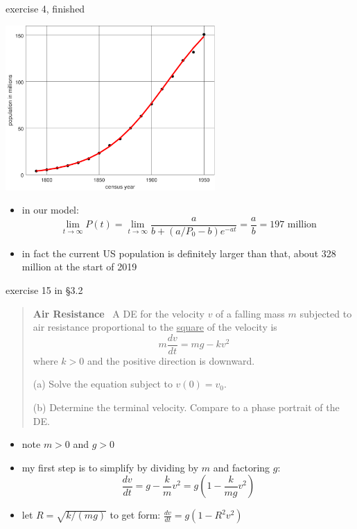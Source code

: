 \documentclass[colorlinks]{beamer}
\begin{document}
\begin{frame}{exercise 4, finished}

\begin{center}
\includegraphics[width=0.6\textwidth]{figs/fitcensus}
\end{center}

\vspace{-2mm}
\begin{itemize}
\item in our model:
    $$\lim_{t\to \infty} P(t) = \lim_{t\to \infty} \frac{a}{b+(a/P_0-b) e^{-at}} = \frac{a}{b} = 197 \text{ million}$$
\item in fact the current US population is definitely larger than that, about 328 million at the start of 2019
\end{itemize}
\end{frame}


\begin{frame}{exercise 15 in \S3.2}

\begin{quotation}
\noindent \textbf{Air Resistance} \, A DE for the velocity $v$ of a falling mass $m$ subjected to air resistance proportional to the \underline{square} of the velocity is
    $$m \frac{dv}{dt} = m g - k v^2$$
where $k>0$ and the positive direction is downward.

(a) Solve the equation subject to $v(0)=v_0$.

(b) Determine the terminal velocity.  Compare to a phase portrait of the DE.
\end{quotation}

\begin{itemize}
\item note $m>0$ and $g>0$
\item my first step is to simplify by dividing by $m$ and factoring $g$:
    $$\frac{dv}{dt} = g - \frac{k}{m} v^2 = g \left(1 - \frac{k}{mg} v^2\right)$$
\item let $R=\sqrt{k/(mg)}$ to get form: $\frac{dv}{dt} = g \left(1 - R^2 v^2\right)$
\end{itemize}
\end{frame}
\end{document}
